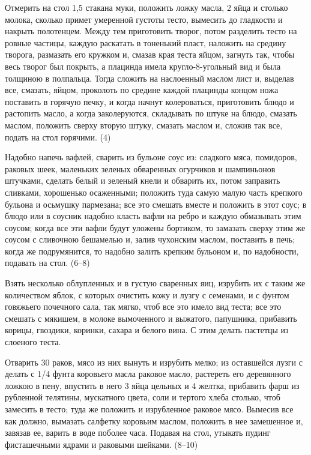 
Отмерить на стол 1,5 стакана муки, положить ложку масла, 2 яйца и столько молока, сколько примет умеренной густоты тесто, вымесить до гладкости и накрыть полотенцем. Между тем приготовить творог, потом разделить тесто на ровные частицы, каждую раскатать в тоненький пласт, наложить на средину творога, размазать его кружком и, смазав края теста яйцом, загнуть так, чтобы весь творог был покрыть, а плацинда имела кругло-8-угольный вид и была толщиною в полпальца. Тогда сложить на наслоенный маслом лист и, выделав все, смазать, яйцом, проколоть по средине каждой плацинды концом ножа поставить в горячую печку, и когда начнут колероваться, приготовить блюдо и растопить масло, а когда заколеруются, складывать по штуке на блюдо, смазать маслом, положить сверху вторую штуку, смазать маслом и, сложив так все, подать на стол горячими. (4) 


Надобно напечь вафлей, сварить из бульоне соус из: сладкого мяса, помидоров, раковых шеек, маленьких зеленых обваренных огурчиков и шампиньонов штучками, сделать белый и зеленый кнели и обварить их, потом заправить сливками, хорошенько осаженными; положить туда самую малую часть крепкого бульона и осьмушку пармезана; все это смешать вместе и положить в этот соус; в блюдо или в соусник надобно класть вафли на ребро и каждую обмазывать этим соусом; когда все эти вафли будут уложены бортиком, то замазать сверху этим же соусом с сливочною бешамелью и, залив чухонским маслом, поставить в печь; когда же подрумянится, то надобно залить крепким бульоном и, по надобности, подавать на стол. (6--8) 


Взять несколько облупленных и в густую сваренных яиц, изрубить их с таким же количеством яблок, с которых очистить кожу и лузгу с семенами, и с фунтом говяжьего почечного сала, так мягко, чтоб все это имело вид теста; все это смешать с мякишем, в молоке вымоченного и выжатого, папушника, прибавить корицы, гвоздики, коринки, сахара и белого вина. С этим делать пастетцы из слоеного теста. 


Отварить 30 раков, мясо из них вынуть и изрубить мелко; из оставшейся лузги с делать с 1/4 фунта коровьего масла раковое масло, растереть его деревянного ложкою в пену, впустить в него 3 яйца цельных и 4 желтка, прибавить фарш из рубленной телятины, мускатного цвета, соли и тертого хлеба столько, чтоб замесить в тесто; туда же положить и изрубленное раковое мясо. Вымесив все как должно, вымазать салфетку коровьим маслом, положить в нее замешенное и, завязав ее, варить в воде поболее часа. Подавая на стол, утыкать пудинг фисташечными ядрами и раковыми шейками. (8--10) 

